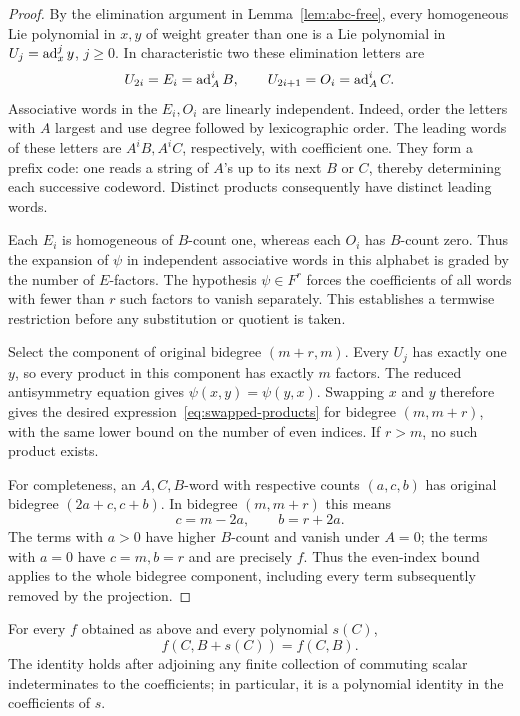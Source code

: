 \begin{proof}
By the elimination argument in Lemma~\ref{lem:abc-free}, every
homogeneous Lie polynomial in $x,y$ of weight greater than one is a
Lie polynomial in $U_j=\operatorname{ad}_x^j y$, $j\geq0$.
In characteristic two these elimination letters are
\[
 U_{2i}=E_i=\operatorname{ad}_A^i B,
 \qquad
 U_{2i+1}=O_i=\operatorname{ad}_A^i C.
\]
Associative words in the $E_i,O_i$ are linearly independent.
Indeed, order the letters with $A$ largest and use degree followed
by lexicographic order.  The leading words of these letters are
$A^iB,A^iC$, respectively, with coefficient one.
They form a prefix code: one reads a string of $A$'s up to its
next $B$ or $C$, thereby determining each successive codeword.
Distinct products consequently have distinct leading words.

Each $E_i$ is homogeneous of $B$-count one, whereas each $O_i$
has $B$-count zero.  Thus the expansion of $\psi$ in independent
associative words in this alphabet is graded by the number of
$E$-factors.  The hypothesis $\psi\in F^r$ forces the coefficients
of all words with fewer than $r$ such factors to vanish separately.
This establishes a termwise restriction before any substitution
or quotient is taken.

Select the component of original bidegree $(m+r,m)$.
Every $U_j$ has exactly one $y$, so every product in this component
has exactly $m$ factors.  The reduced antisymmetry equation gives
$\psi(x,y)=\psi(y,x)$.  Swapping $x$ and $y$ therefore gives
the desired expression~\eqref{eq:swapped-products} for bidegree
$(m,m+r)$, with the same lower bound on the number of even indices.
If $r>m$, no such product exists.

For completeness, an $A,C,B$-word with respective counts $(a,c,b)$
has original bidegree $(2a+c,c+b)$.  In bidegree $(m,m+r)$ this means
\begin{equation}
 \label{eq:bidegree-counts}
 c=m-2a,\qquad b=r+2a.
\end{equation}
The terms with $a>0$ have higher $B$-count and vanish under $A=0$;
the terms with $a=0$ have $c=m,b=r$ and are precisely $f$.
Thus the even-index bound applies to the whole bidegree component,
including every term subsequently removed by the projection.
\end{proof}

\begin{lemma}
\label{lem:shift-invariance}
For every $f$ obtained as above and every polynomial $s(C)$,
\begin{equation}
 \label{eq:polynomial-shift}
 f(C,B+s(C))=f(C,B).
\end{equation}
The identity holds after adjoining any finite collection of
commuting scalar indeterminates to the coefficients; in particular,
it is a polynomial identity in the coefficients of $s$.
\end{lemma}

